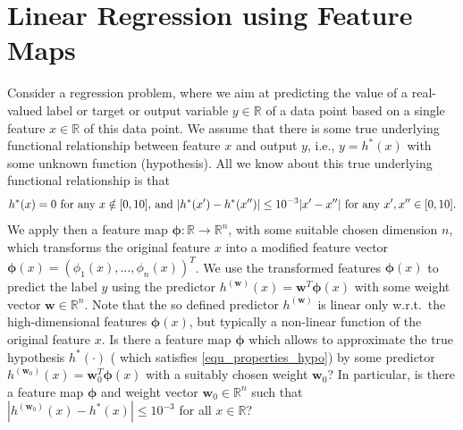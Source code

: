 \documentclass[article,11pt]{article}
\begin{document}

\newpage
\section{Linear Regression using Feature Maps}
Consider a regression problem, where we aim at predicting the value of a real-valued label or target or output variable $y \in \mathbb{R}$ of a data point 
based on a single feature $x \in \mathbb{R}$ of this data point. We assume that there is some true underlying functional relationship between 
feature $x$ and output $y$, i.e., $y =h^{*}(x)$ with some unknown function (hypothesis). All we know about this true underlying functional relationship is 
that 
\vspace*{-2mm}
\begin{equation}
\label{equ_properties_hypo}
h^{*}(x) = 0 \mbox{ for any } x \notin [0,10]  \mbox{, and } |h^{*}(x') -h^{*}(x'')| \leq 10^{-3} |x'-x''| \mbox{ for any } x',x'' \in[0,10]. 
\vspace*{-2mm}
\end{equation}
We apply then a feature map ${\bm \phi}: \mathbb{R} \rightarrow \mathbb{R}^{n}$, with some suitable chosen dimension $n$, which transforms 
the original feature $x$ into a modified feature vector ${\bm \phi}(x)=(\phi_{1}(x),\ldots,\phi_{n}(x))^{T}$. We use the transformed features 
${\bm \phi}(x)$ to predict the label $y$ using the predictor $h^{(\mathbf{w})}(x) = \mathbf{w}^{T} {\bm \phi}(x)$ with some weight vector $\mathbf{w}\in \mathbb{R}^{n}$. 
Note that the so defined predictor $h^{(\mathbf{w})}$ is linear only w.r.t.\ the high-dimensional features ${\bm \phi}(x)$, but typically 
a non-linear function of the original feature $x$. Is there a feature map ${\bm \phi}$ which allows to approximate the true hypothesis $h^{*}(\cdot)$ (
which satisfies \eqref{equ_properties_hypo}) by some predictor $h^{(\mathbf{w}_{0})}(x) =  \mathbf{w}_{0}^{T} {\bm \phi}(x)$ with a suitably chosen weight $\mathbf{w}_{0}$?
In particular, is there a feature map ${\bm \phi}$ and weight vector $\mathbf{w}_{0} \in \mathbb{R}^{n}$ such that $|h^{(\mathbf{w}_{0})}(x) - h^{*}(x)| \leq 10^{-3}$ for all $x \in \mathbb{R}$?

\end{document}
